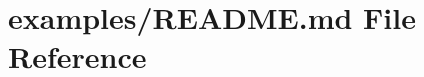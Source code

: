\hypertarget{examples_2README_8md}{}\section{examples/\+R\+E\+A\+D\+ME.md File Reference}
\label{examples_2README_8md}
